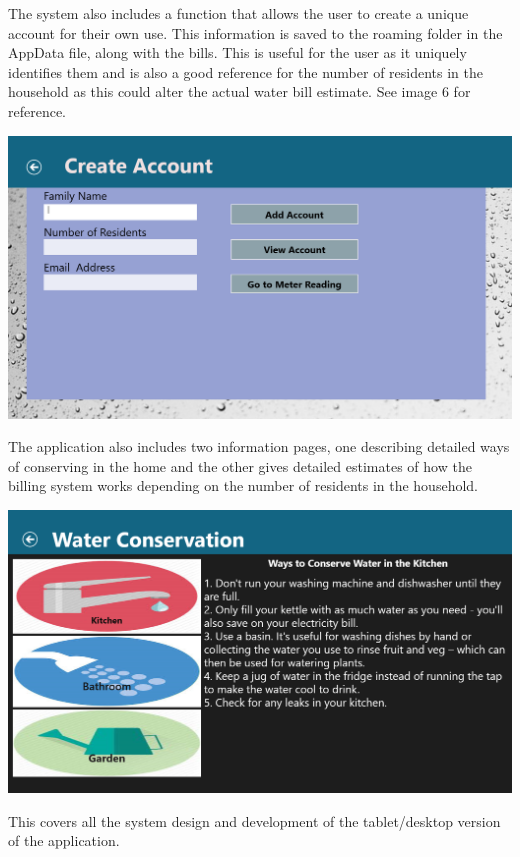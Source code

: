 \documentclass[runningheads,a4paper]{llncs}
\begin{document}
The system also includes a function that allows the user to create a unique account for their own use. This information is saved to the roaming folder in the AppData file, along with the bills. This is useful for the user as it uniquely identifies them and is also a good reference for the number of residents in the household as this could alter the actual water bill estimate. See image 6 for reference.

\includegraphics[scale=0.2]{ScreenShotCreate}

The application also includes two information pages, one describing detailed ways of conserving in the home and the other gives detailed estimates of how the billing system works depending on the number of residents in the household. 

\includegraphics[scale=0.2]{ScreenShotWaterCon}

This covers all the system design and development of the tablet/desktop version of the application.
\end{document}

